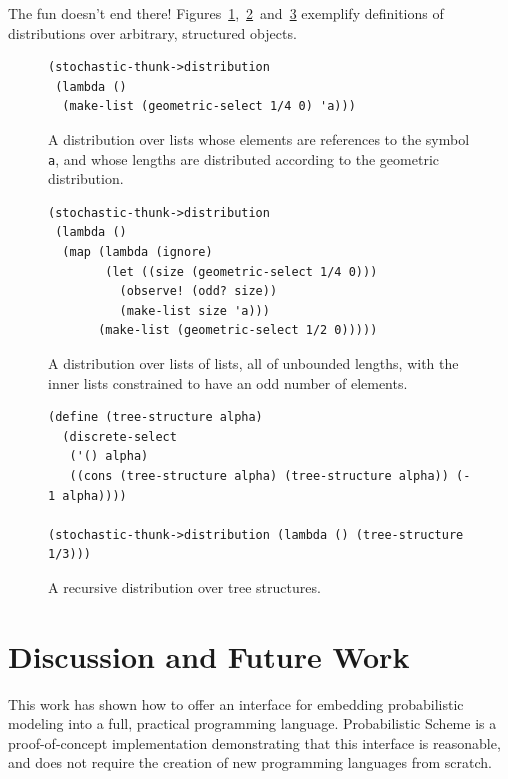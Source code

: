 \documentclass[10pt]{sigplanconf}
\newcommand{\code}[1]{\texttt{#1}}
\begin{document}
The fun doesn't end there!
Figures~\ref{geom-list},~\ref{list-list}~and~\ref{tree} exemplify
definitions of distributions over arbitrary, structured objects.
\begin{figure}[tbph]
\begin{verbatim}
(stochastic-thunk->distribution
 (lambda ()
  (make-list (geometric-select 1/4 0) 'a)))
\end{verbatim}
\caption{A distribution over lists whose elements are references to
the symbol \code{a}, and whose lengths are distributed according to
the geometric distribution.}
\label{geom-list}
\end{figure}
\begin{figure}[tbph]
\begin{verbatim}
(stochastic-thunk->distribution
 (lambda ()
  (map (lambda (ignore)
        (let ((size (geometric-select 1/4 0)))
          (observe! (odd? size))
          (make-list size 'a)))
       (make-list (geometric-select 1/2 0)))))
\end{verbatim}
\caption{A distribution over lists of lists, all of unbounded lengths,
with the inner lists constrained to have an odd number of elements.}
\label{list-list}
\end{figure}
\begin{figure}[tbph]
\begin{verbatim}
(define (tree-structure alpha)
  (discrete-select
   ('() alpha)
   ((cons (tree-structure alpha) (tree-structure alpha)) (- 1 alpha))))

(stochastic-thunk->distribution (lambda () (tree-structure 1/3)))
\end{verbatim}
\caption{A recursive distribution over tree structures.}
\label{tree}
\end{figure}

\section{Discussion and Future Work}
\label{discussion}

This work has shown how to offer an interface for embedding
probabilistic modeling into a full, practical programming language.
Probabilistic Scheme is a proof-of-concept implementation
demonstrating that this interface is reasonable, and does not require
the creation of new programming languages from scratch.
\end{document}
